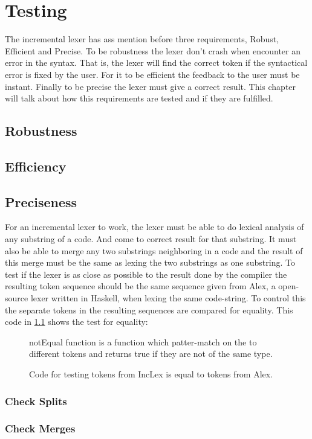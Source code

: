 \chapter{Testing}
The incremental lexer has ass mention before three requirements, Robust, Efficient and Precise. To be robustness the lexer don't crash when encounter an error in the syntax. That is, the lexer will find the correct token if the syntactical error is fixed by the user. For it to be efficient the feedback to the user must be instant.
Finally to be precise the lexer must give a correct result. This chapter will talk about how this requirements are tested and if they are fulfilled. 

\section{Robustness}

\section{Efficiency}

\section{Preciseness}
For an incremental lexer to work, the lexer must be able to do lexical analysis of any substring of a code. And come to correct result for that substring. It must also be able to merge any two substrings neighboring in a code and the result of this merge must be the same as lexing the two substrings as one substring.
To test if the lexer is as close as possible to the result done by the compiler the resulting token sequence should be the same sequence given from Alex, a open-source lexer written in Haskell, when lexing the same code-string.
To control this the separate tokens in the resulting sequences are compared for equality. 
This code in \cref{fig:CheckEquility} shows the test for equality:

\begin{figure}[h!]
  \centering
  
  notEqual function is a function which patter-match on the to different tokens and returns true if they are not of the same type.
  \caption{Code for testing tokens from IncLex is equal to tokens from Alex. 
  \label{fig:CheckEquility}}
\end{figure} 

\subsection{Check Splits}

\subsection{Check Merges} 

